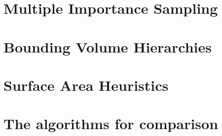 \section{Multiple Importance Sampling}
\label{ch:preliminaries:mis}

\section{Bounding Volume Hierarchies}
\label{sec:preliminaries:bvh}

\section{Surface Area Heuristics}
\label{sec:preliminaries:sah}

\section{The algorithms for comparison}
\label{sec:preliminaries:com}